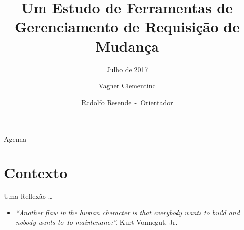 \documentclass[t,14pt,mathserif]{beamer}
\title[] %
{Um Estudo de Ferramentas de \\
Gerenciamento de Requisição de Mudança}
\subtitle{Julho de 2017}
\author[] %
{Vagner Clementino\\%
	\and Rodolfo Resende~-~Orientador%
	}
\institute[] %
{Departamento de Ciência da Computação\\
 Universidade Federal de Minas Gerais
}
\date[2017/07/13] %
\begin{document}
\begin{frame}
  \titlepage{}
\end{frame}

\begin{frame}{Agenda}
  \tableofcontents[pausesections]
\end{frame}




\section{Contexto}

\begin{frame}{Uma Reflexão \ldots}
\begin{itemize}
    \item \textit{``Another flaw in the human character is that everybody wants
            to build and nobody wants to do maintenance''.} Kurt Vonnegut, Jr.
\end{itemize}
\end{frame}
\end{document}
